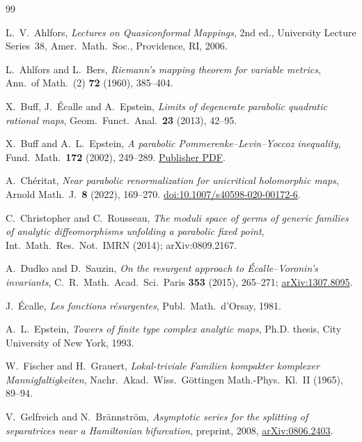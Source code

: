 \begin{thebibliography}{99}

L.~V.~Ahlfors,
\emph{Lectures on Quasiconformal Mappings}, 2nd ed.,
University Lecture Series~38, Amer.\ Math.\ Soc., Providence, RI, 2006.

L.~Ahlfors and L.~Bers,
\emph{Riemann's mapping theorem for variable metrics},
Ann.\ of Math.\ (2) \textbf{72} (1960), 385--404.

X.~Buff, J.~\'Ecalle and A.~Epstein,
\emph{Limits of degenerate parabolic quadratic rational maps},
Geom.\ Funct.\ Anal.\ \textbf{23} (2013), 42--95.

X.~Buff and A.~L.~Epstein,
\emph{A parabolic Pommerenke--Levin--Yoccoz inequality},
Fund.\ Math.\ \textbf{172} (2002), 249--289.
\href{https://www.impan.pl/shop/en/publication/transaction/download/product/89261}{Publisher PDF}.

A.~Ch\'eritat,
\emph{Near parabolic renormalization for unicritical holomorphic maps},
Arnold Math.\ J.\ \textbf{8} (2022), 169--270.
\href{https://doi.org/10.1007/s40598-020-00172-6}{doi:10.1007/s40598-020-00172-6}.

C.~Christopher and C.~Rousseau,
\emph{The moduli space of germs of generic families of analytic
diffeomorphisms unfolding a parabolic fixed point},
Int.\ Math.\ Res.\ Not.\ IMRN (2014); arXiv:0809.2167.

A.~Dudko and D.~Sauzin,
\emph{On the resurgent approach to \'Ecalle--Voronin's invariants},
C.\ R.\ Math.\ Acad.\ Sci.\ Paris \textbf{353} (2015), 265--271;
\href{https://arxiv.org/abs/1307.8095}{arXiv:1307.8095}.

J.~\'Ecalle,
\emph{Les fonctions r\'esurgentes}, Publ.\ Math.\ d'Orsay, 1981.

A.~L.~Epstein,
\emph{Towers of finite type complex analytic maps},
Ph.D. thesis, City University of New York, 1993.

W.~Fischer and H.~Grauert,
\emph{Lokal-triviale Familien kompakter komplexer Mannigfaltigkeiten},
Nachr.\ Akad.\ Wiss.\ G\"ottingen Math.-Phys.\ Kl.\ II (1965), 89--94.

V.~Gelfreich and N.~Br\"annstr\"om,
\emph{Asymptotic series for the splitting of separatrices near a Hamiltonian
bifurcation}, preprint, 2008,
\href{https://arxiv.org/abs/0806.2403}{arXiv:0806.2403}.


\end{thebibliography}
